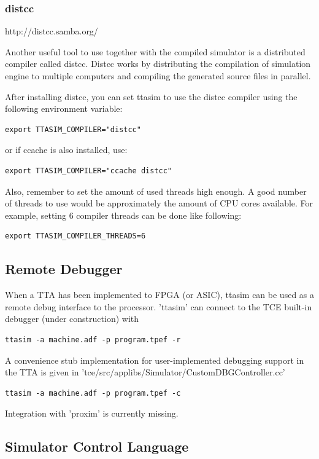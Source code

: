 \documentclass[a4paper,twoside]{tceusermanual}
\begin{document}
\subsubsection{distcc}
http://distcc.samba.org/

Another useful tool to use together with the compiled simulator is a
distributed compiler called distcc. Distcc works by distributing the 
compilation of simulation engine to multiple computers and compiling 
the generated source files in parallel.

After installing distcc, you can set ttasim to use the distcc compiler using the
following environment variable:
\begin{verbatim}
export TTASIM_COMPILER="distcc"
\end{verbatim} or if ccache is also installed, use:
\begin{verbatim}
export TTASIM_COMPILER="ccache distcc"\end{verbatim}

Also, remember to set the amount of used threads high enough. A good number
of threads to use would be approximately the amount of CPU cores
available. For example, setting 6 compiler threads can be done like following:
\begin{verbatim}
export TTASIM_COMPILER_THREADS=6
\end{verbatim}

\subsection{Remote Debugger}

When a TTA has been implemented to FPGA (or ASIC), ttasim can be used
as a remote debug interface to the processor. 'ttasim' can connect to the
TCE built-in debugger (under construction) with 
\begin{verbatim}
ttasim -a machine.adf -p program.tpef -r
\end{verbatim}

A convenience stub implementation for user-implemented debugging support in the TTA
is given in 'tce/src/applibs/Simulator/CustomDBGController.cc'
\begin{verbatim}
ttasim -a machine.adf -p program.tpef -c
\end{verbatim}

Integration with 'proxim' is currently missing.


\subsection{Simulator Control Language}
\end{document}
